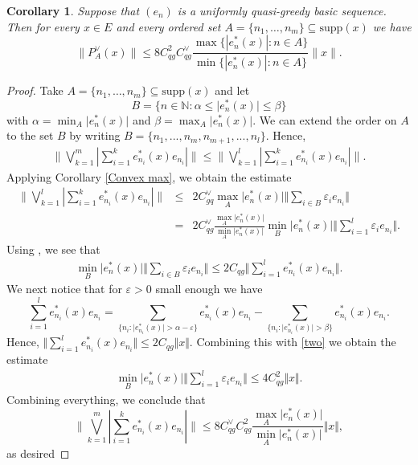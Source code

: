 \documentclass[12pt,leqno]{amsart}
\newtheorem{corollary}[theorem]{Corollary}
\numberwithin{equation}{section}
\theoremstyle{definition}
\def\N{{\mathbb N}}
\begin{document}
\begin{corollary}\label{Similar asymptotics}
Suppose that $(e_n)$ is a uniformly quasi-greedy basic sequence. Then for every $x\in E$ and every ordered set $A=\{n_1,\dots,n_m\}\subseteq \text{supp}(x)$ we have
$$\|P_A^\vee (x)\|\leq 8C_{qg}^2C_{qg}^\vee\frac{\max\{|e_n^*(x)| : n\in A\}}{\min\{|e_n^*(x)| : n\in A\}}\|x\|.$$
\end{corollary}
\begin{proof}
Take $A=\{n_1,\dots,n_m\}\subseteq \text{supp}(x)$ and let  $$B=\{n\in\N : \alpha \leq \vert e_{n}^*(x)\vert\leq \beta\}$$ with $\alpha = \min_{A}\vert e_{n}^*(x)\vert$ and $\beta=\max_{A}\vert e_{n}^*(x)\vert$. We can extend the order on $A$ to the set $B$ by writing $B=\{n_1,...,n_m,n_{m+1},...,n_l\}$. Hence,
\begin{eqnarray}\label{one2}
\bigg\|\bigvee_{k=1}^m\left|\sum_{i=1}^k e_{n_i}^*(x)e_{n_i}\right|\bigg\|\leq \bigg\|\bigvee_{k=1}^l\left|\sum_{i=1}^k e_{n_i}^*(x)e_{n_i}\right|\bigg\|.
\end{eqnarray}
Applying  Corollary \ref{Convex max}, we obtain the estimate
\begin{eqnarray*}
\bigg\|\bigvee_{k=1}^l\left|\sum_{i=1}^k e_{n_i}^*(x)e_{n_i}\right|\bigg\|&\leq& 2C_{gq}^\vee \max_A\vert e_{n}^*(x)\vert \Vert \sum_{i\in B}\varepsilon_i e_{n_i}\Vert\\
&=& 2C_{qg}^\vee \frac{\max_A\vert e_{n}^*(x)\vert}{\min_A\vert e_{n}^*(x)\vert}\min_B \vert e_{n}^*(x)\vert  \Vert \sum_{i=1}^l\varepsilon_i e_{n_i}\Vert.
\end{eqnarray*}
Using \cite[Lemma 2.3 ]{BBG},  we see that
\begin{eqnarray}\label{two}
\min_B \vert e_{n}^*(x)\vert  \Vert \sum_{i\in B}\varepsilon_i e_{n_i}\Vert\leq 2C_{qg}\Vert \sum_{i=1}^le_{n_i}^*(x)e_{n_i}\Vert.
\end{eqnarray}
We next notice that for $\varepsilon >0$ small enough we have
$$\sum_{i=1}^l e_{n_i}^*(x)e_{n_i} = \sum_{\lbrace n_i: \vert e_{n_i}^*(x)\vert>\alpha-\varepsilon\rbrace}e_{n_i}^*(x)e_{n_i}- \sum_{\lbrace n_i: \vert e_{n_i}^*(x)\vert>\beta\rbrace}e_{n_i}^*(x)e_{n_i}.$$
Hence, $\Vert \sum_{i=1}^l e_{n_i}^*(x)e_{n_i}  \Vert \leq 2C_{qg}\Vert x\Vert.$ Combining this with \eqref{two} we obtain the estimate
\begin{eqnarray}\label{three}
\min_B \vert e_{n}^*(x)\vert  \Vert \sum_{i=1}^l\varepsilon_i e_{n_i}\Vert\leq 4C_{qg}^2\Vert x\Vert.
\end{eqnarray} 
Combining everything, we conclude that
$$\bigg\|\bigvee_{k=1}^m\left|\sum_{i=1}^k e_{n_i}^*(x)e_{n_i}\right|\bigg\|\leq 8C_{qg}^\vee C_{qg}^2\frac{\max_A\vert e_{n}^*(x)\vert}{\min_A\vert e_{n}^*(x)\vert} \Vert x\Vert,$$
as desired

\end{proof}
\end{document}
